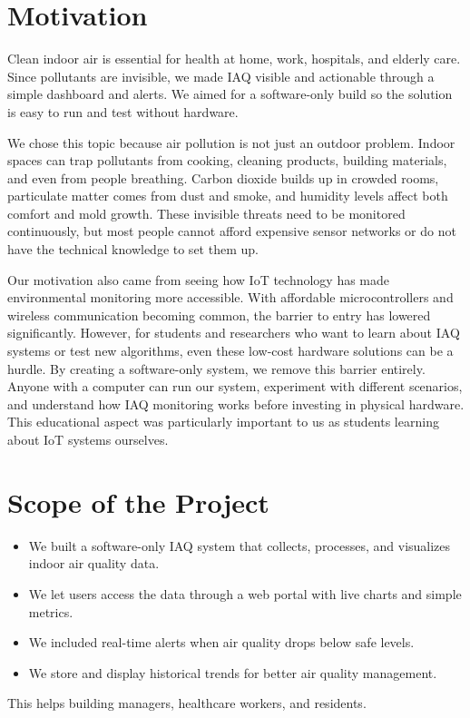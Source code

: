 \documentclass[12pt]{report}
\begin{document}
\section{Motivation}
Clean indoor air is essential for health at home, work, hospitals, and elderly care. Since pollutants are invisible, we made IAQ visible and actionable through a simple dashboard and alerts. We aimed for a software-only build so the solution is easy to run and test without hardware.

We chose this topic because air pollution is not just an outdoor problem. Indoor spaces can trap pollutants from cooking, cleaning products, building materials, and even from people breathing. Carbon dioxide builds up in crowded rooms, particulate matter comes from dust and smoke, and humidity levels affect both comfort and mold growth. These invisible threats need to be monitored continuously, but most people cannot afford expensive sensor networks or do not have the technical knowledge to set them up.

Our motivation also came from seeing how IoT technology has made environmental monitoring more accessible. With affordable microcontrollers and wireless communication becoming common, the barrier to entry has lowered significantly. However, for students and researchers who want to learn about IAQ systems or test new algorithms, even these low-cost hardware solutions can be a hurdle. By creating a software-only system, we remove this barrier entirely. Anyone with a computer can run our system, experiment with different scenarios, and understand how IAQ monitoring works before investing in physical hardware. This educational aspect was particularly important to us as students learning about IoT systems ourselves.

\section{Scope of the Project}
\begin{itemize}
  \item We built a software-only IAQ system that collects, processes, and visualizes indoor air quality data.
  \item We let users access the data through a web portal with live charts and simple metrics.
  \item We included real-time alerts when air quality drops below safe levels.
  \item We store and display historical trends for better air quality management.
\end{itemize}
This helps building managers, healthcare workers, and residents.
\end{document}
